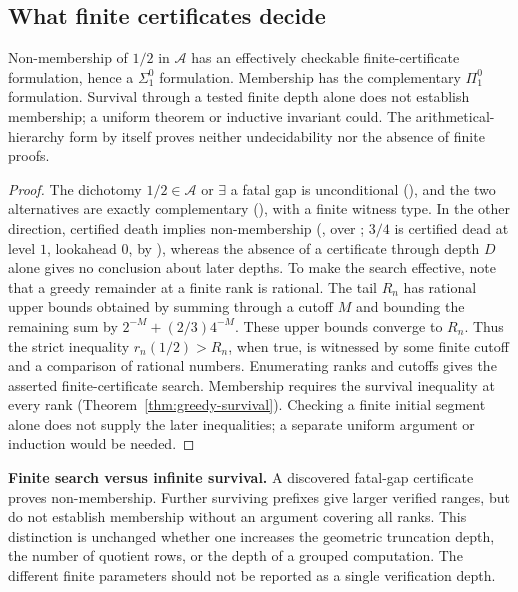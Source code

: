 \subsection{What finite certificates decide}
\label{bar:asym}

\begin{thm}
\label{thm:one-sided}
Non-membership of $1/2$ in $\mathcal A$ has an effectively checkable
finite-certificate formulation, hence a $\Sigma^0_1$ formulation.
Membership has the complementary $\Pi^0_1$ formulation. Survival through a tested finite
depth alone does not establish membership; a uniform theorem or inductive invariant could.
The arithmetical-hierarchy form by itself proves neither undecidability nor the absence of finite
proofs.
\end{thm}

\begin{proof}
The dichotomy $1/2 \in \mathcal{A}$ or $\exists$ a fatal gap is unconditional
(), and the
two alternatives are exactly complementary
(),
with  a finite witness type. In the other
direction, certified death implies non-membership
(, over
; $3/4$ is certified dead at
level $1$, lookahead $0$, by
), whereas the
absence of a certificate through depth $D$ alone gives no conclusion
about later depths.  To make the search effective, note that a greedy
remainder at a finite rank is rational.  The tail $R_n$ has rational
upper bounds obtained by summing through a cutoff $M$ and bounding the
remaining sum by $2^{-M}+(2/3)4^{-M}$.  These upper bounds converge to
$R_n$.  Thus the strict inequality $r_n(1/2)>R_n$, when true, is witnessed
by some finite cutoff and a comparison of rational numbers.  Enumerating
ranks and cutoffs gives the asserted finite-certificate search.
Membership requires the survival inequality at every rank
(Theorem~\ref{thm:greedy-survival}).  Checking a finite initial segment
alone does not supply the later inequalities; a separate uniform argument
or induction would be needed.
\end{proof}

\textbf{Finite search versus infinite survival.}
A discovered fatal-gap certificate proves non-membership.  Further
surviving prefixes give larger verified ranges, but do not establish
membership without an argument covering all ranks.  This distinction
is unchanged whether one increases the geometric truncation depth,
the number of quotient rows, or the depth of a grouped computation.
The different finite parameters should not be reported as a single
verification depth.

